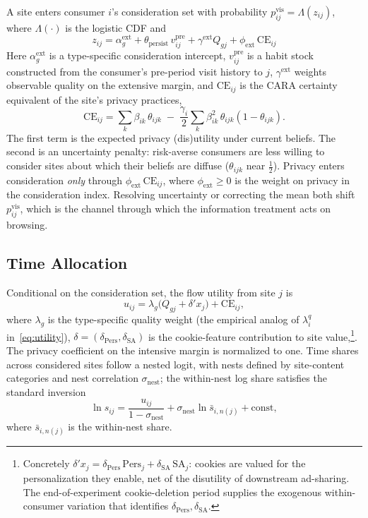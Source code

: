\documentclass[12pt]{article}
\theoremstyle{definition}
\newcommand{\CE}{\text{CE}}
\theoremstyle{remark}
\begin{document}
{A site enters consumer $i$'s consideration set with probability $p^{\text{vis}}_{ij} = \Lambda(z_{ij})$, where $\Lambda(\cdot)$ is the logistic CDF and
\begin{equation}\label{eq:em_z}
  z_{ij} = \alpha^{\text{ext}}_g + \theta_{\text{persist}}\, v^{\text{pre}}_{ij} + \gamma^{\text{ext}} Q_{gj} + \phi_{\text{ext}}\, \CE_{ij}
\end{equation}
Here $\alpha^{\text{ext}}_g$ is a type-specific consideration intercept, $v^{\text{pre}}_{ij}$ is a habit stock constructed from the consumer's pre-period visit history to $j$, $\gamma^{\text{ext}}$ weights observable quality on the extensive margin, and $\CE_{ij}$ is the CARA certainty equivalent of the site's privacy practices,
\begin{equation}\label{eq:em_ce}
  \CE_{ij} = \sum_{k} \beta_{ik}\,\theta_{ijk} \;-\; \frac{\gamma_i}{2} \sum_{k} \beta_{ik}^2\, \theta_{ijk}(1 - \theta_{ijk}).
\end{equation}
The first term is the expected privacy (dis)utility under current beliefs. The second is an uncertainty penalty: risk-averse consumers are less willing to consider sites about which their beliefs are diffuse ($\theta_{ijk}$ near $\tfrac12$). Privacy enters consideration \emph{only} through $\phi_{\text{ext}}\,\CE_{ij}$, where $\phi_{\text{ext}} \ge 0$ is the weight on privacy in the consideration index. Resolving uncertainty or correcting the mean both shift $p^{\text{vis}}_{ij}$, which is the channel through which the information treatment acts on browsing.

\subsection{Time Allocation}

Conditional on the consideration set, the flow utility from site $j$ is
\begin{equation}\label{eq:em_uint}
  u_{ij} = \lambda_g \bigl(Q_{gj} + \delta' x_j\bigr) + \CE_{ij},
\end{equation}
where $\lambda_g$ is the type-specific quality weight (the empirical analog of $\lambda^q_i$ in~\eqref{eq:utility}), $\delta = (\delta_{\text{Pers}}, \delta_{\text{SA}})$ is the cookie-feature contribution to site value,\footnote{Concretely $\delta' x_j = \delta_{\text{Pers}}\,\text{Pers}_j + \delta_{\text{SA}}\,\text{SA}_j$: cookies are valued for the personalization they enable, net of the disutility of downstream ad-sharing. The end-of-experiment cookie-deletion period supplies the exogenous within-consumer variation that identifies $\delta_{\text{Pers}}, \delta_{\text{SA}}$.}. The privacy coefficient on the intensive margin is normalized to one. Time shares across considered sites follow a nested logit, with nests defined by site-content categories and nest correlation $\sigma_{\text{nest}}$; the within-nest log share satisfies the standard inversion
\begin{equation}\label{eq:em_nl}
  \ln s_{ij} = \frac{u_{ij}}{1 - \sigma_{\text{nest}}} + \sigma_{\text{nest}} \ln \bar{s}_{i, n(j)} + \text{const},
\end{equation}
where $\bar{s}_{i,n(j)}$ is the within-nest share. 

}
\end{document}
